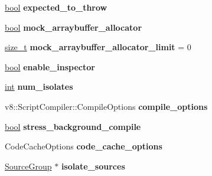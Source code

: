 \begin{DoxyCompactItemize}
\item 
\mbox{\label{classv8_1_1ShellOptions_ae85fcfe7caddc5dca5d2b15bef3d120a}} 
\mbox{\hyperlink{classbool}{bool}} {\bfseries expected\+\_\+to\+\_\+throw}
\item 
\mbox{\label{classv8_1_1ShellOptions_a1a3438baa8bc8603c04ee0e4340a5c98}} 
\mbox{\hyperlink{classbool}{bool}} {\bfseries mock\+\_\+arraybuffer\+\_\+allocator}
\item 
\mbox{\label{classv8_1_1ShellOptions_aac45d37d13f61a5ce9cb870469c9e173}} 
\mbox{\hyperlink{classsize__t}{size\+\_\+t}} {\bfseries mock\+\_\+arraybuffer\+\_\+allocator\+\_\+limit} = 0
\item 
\mbox{\label{classv8_1_1ShellOptions_aafe8c610aedabd8e96a2d21630412870}} 
\mbox{\hyperlink{classbool}{bool}} {\bfseries enable\+\_\+inspector}
\item 
\mbox{\label{classv8_1_1ShellOptions_ae54d644c9cf130de4621fc7da0238811}} 
\mbox{\hyperlink{classint}{int}} {\bfseries num\+\_\+isolates}
\item 
\mbox{\label{classv8_1_1ShellOptions_a709958f798705295ed94fc1558c05833}} 
v8\+::\+Script\+Compiler\+::\+Compile\+Options {\bfseries compile\+\_\+options}
\item 
\mbox{\label{classv8_1_1ShellOptions_ab00087bf8c5aeead011cb9b7748cfc95}} 
\mbox{\hyperlink{classbool}{bool}} {\bfseries stress\+\_\+background\+\_\+compile}
\item 
\mbox{\label{classv8_1_1ShellOptions_aeae427a56ff24e1dad3ce32487a02e86}} 
Code\+Cache\+Options {\bfseries code\+\_\+cache\+\_\+options}
\item 
\mbox{\label{classv8_1_1ShellOptions_a07329ee8598bf8dc66974fdd8a01f2f5}} 
\mbox{\hyperlink{classv8_1_1SourceGroup}{Source\+Group}} $\ast$ {\bfseries isolate\+\_\+sources}
\item 
\mbox{\label{classv8_1_1ShellOptions_a18d1f36a0620224c26d36622b1d5a5c0}} 

\end{DoxyCompactItemize}
